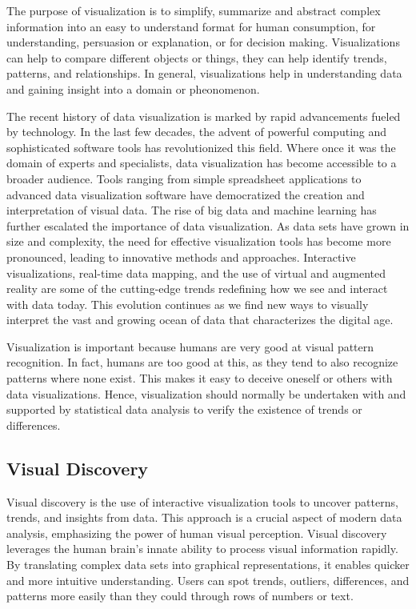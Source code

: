 The purpose of visualization is to simplify, summarize and abstract complex information into an easy to understand format for human consumption, for understanding, persuasion or explanation, or for decision making. Visualizations can help to compare different objects or things, they can help identify trends, patterns, and relationships. In general, visualizations help in understanding data and gaining insight into a domain or pheonomenon.

The recent history of data visualization is marked by rapid advancements fueled by technology. In the last few decades, the advent of powerful computing and sophisticated software tools has revolutionized this field. Where once it was the domain of experts and specialists, data visualization has become accessible to a broader audience. Tools ranging from simple spreadsheet applications to advanced data visualization software have democratized the creation and interpretation of visual data. The rise of big data and machine learning has further escalated the importance of data visualization. As data sets have grown in size and complexity, the need for effective visualization tools has become more pronounced, leading to innovative methods and approaches. Interactive visualizations, real-time data mapping, and the use of virtual and augmented reality are some of the cutting-edge trends redefining how we see and interact with data today. This evolution continues as we find new ways to visually interpret the vast and growing ocean of data that characterizes the digital age.

Visualization is important because humans are very good at visual pattern recognition. In fact, humans are too good at this, as they tend to also recognize patterns where none exist. This makes it easy to deceive oneself or others with data visualizations. Hence, visualization should normally be undertaken with and supported by statistical data analysis to verify the existence of trends or differences.

\subsection*{Visual Discovery}

Visual discovery is the use of interactive visualization tools to uncover patterns, trends, and insights from data. This approach is a crucial aspect of modern data analysis, emphasizing the power of human visual perception. Visual discovery leverages the human brain's innate ability to process visual information rapidly. By translating complex data sets into graphical representations, it enables quicker and more intuitive understanding. Users can spot trends, outliers, differences, and patterns more easily than they could through rows of numbers or text.

